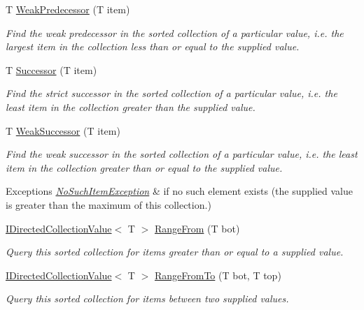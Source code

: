 \begin{DoxyCompactItemize}
T \hyperlink{class_c5_1_1_tree_bag_a7769d690994a68b4728278d08763253e}{Weak\+Predecessor} (T item)
\begin{DoxyCompactList}\small\item\em Find the weak predecessor in the sorted collection of a particular value, i.\+e. the largest item in the collection less than or equal to the supplied value. \end{DoxyCompactList}\item 
T \hyperlink{class_c5_1_1_tree_bag_a50478f4fcbf3584d311b36a88beb3b8e}{Successor} (T item)
\begin{DoxyCompactList}\small\item\em Find the strict successor in the sorted collection of a particular value, i.\+e. the least item in the collection greater than the supplied value. \end{DoxyCompactList}\item 
T \hyperlink{class_c5_1_1_tree_bag_a1f6fe0ae505406d028570bd1d4a75ecb}{Weak\+Successor} (T item)
\begin{DoxyCompactList}\small\item\em Find the weak successor in the sorted collection of a particular value, i.\+e. the least item in the collection greater than or equal to the supplied value. 
\begin{DoxyExceptions}{Exceptions}
{\em \hyperlink{class_c5_1_1_no_such_item_exception}{No\+Such\+Item\+Exception}} & if no such element exists (the supplied value is greater than the maximum of this collection.)\\
\hline
\end{DoxyExceptions}
\end{DoxyCompactList}\item 
\hyperlink{interface_c5_1_1_i_directed_collection_value}{I\+Directed\+Collection\+Value}$<$ T $>$ \hyperlink{class_c5_1_1_tree_bag_a2f3f53133e1b7589fc0434bc9f15c090}{Range\+From} (T bot)
\begin{DoxyCompactList}\small\item\em Query this sorted collection for items greater than or equal to a supplied value. \end{DoxyCompactList}\item 
\hyperlink{interface_c5_1_1_i_directed_collection_value}{I\+Directed\+Collection\+Value}$<$ T $>$ \hyperlink{class_c5_1_1_tree_bag_a5896f33ee9ac13dc5ae15df67db70683}{Range\+From\+To} (T bot, T top)
\begin{DoxyCompactList}\small\item\em Query this sorted collection for items between two supplied values. \end{DoxyCompactList}\item 

\end{DoxyCompactItemize}
